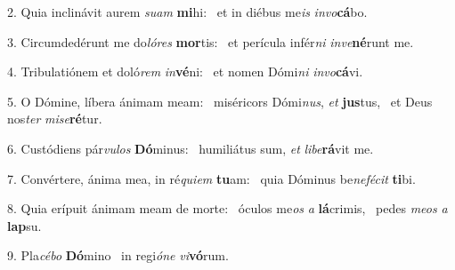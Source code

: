 2. Quia inclinávit aurem \textit{su}\textit{am} \textbf{mi}hi: \ast\  et in diébus me\textit{is} \textit{in}\textit{vo}\textbf{cá}bo.\

3. Circumdedérunt me do\textit{ló}\textit{res} \textbf{mor}tis: \ast\  et perícula infér\textit{ni} \textit{in}\textit{ve}\textbf{né}runt me.\

4. Tribulatiónem et doló\textit{rem} \textit{in}\textbf{vé}ni: \ast\  et nomen Dómi\textit{ni} \textit{in}\textit{vo}\textbf{cá}vi.\

5. O Dómine, líbera ánimam meam: \dag\  miséricors Dómi\textit{nus}, \textit{et} \textbf{jus}tus, \ast\  et Deus nos\textit{ter} \textit{mi}\textit{se}\textbf{ré}tur.\

6. Custódiens pár\textit{vu}\textit{los} \textbf{Dó}minus: \ast\  humiliátus sum, \textit{et} \textit{li}\textit{be}\textbf{rá}vit me.\

7. Convértere, ánima mea, in ré\textit{qui}\textit{em} \textbf{tu}am: \ast\  quia Dóminus be\textit{ne}\textit{fé}\textit{cit} \textbf{ti}bi.\

8. Quia erípuit ánimam meam de morte: \dag\  óculos me\textit{os} \textit{a} \textbf{lá}crimis, \ast\  pedes \textit{me}\textit{os} \textit{a} \textbf{lap}su.\

9. Pla\textit{cé}\textit{bo} \textbf{Dó}mino \ast\  in regi\textit{ó}\textit{ne} \textit{vi}\textbf{vó}rum.\

